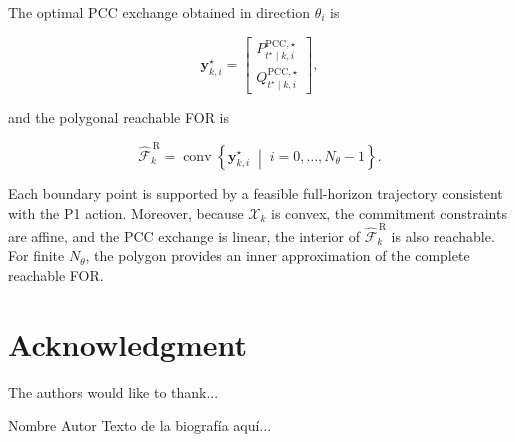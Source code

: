 \documentclass[journal]{IEEEtran}
\begin{document}
The optimal PCC exchange obtained in direction \(\theta_i\) is 

\begin{equation} 
\label{eq:P2_boundary_point} \bm{y}^{\star}_{k,i} = \begin{bmatrix} P^{\mathrm{PCC},\star}_{t^\star\mid k,i} \\[1mm] Q^{\mathrm{PCC},\star}_{t^\star\mid k,i} \end{bmatrix}, \end{equation} 

and the polygonal reachable FOR is 

\begin{equation} 
\label{eq:FOR_polygon} \widehat{\mathcal{F}}_{k}^{\,\mathrm{R}} = \operatorname{conv} \left\{ \bm{y}^{\star}_{k,i} \;\middle|\; i=0,\ldots,N_\theta-1 \right\}. 
\end{equation} 

Each boundary point is supported by a feasible full-horizon trajectory consistent with the P1 action. Moreover, because \(\mathcal{X}_{k}\) is convex, the commitment constraints are affine, and the PCC exchange is linear, the interior of \(\widehat{\mathcal{F}}_{k}^{\,\mathrm{R}}\) is also reachable. For finite \(N_\theta\), the polygon provides an inner approximation of the complete reachable FOR. 

\section*{Acknowledgment}


The authors would like to thank...




\begin{IEEEbiographynophoto}{Nombre Autor}
Texto de la biografía aquí...


\end{IEEEbiographynophoto}
\end{document}
